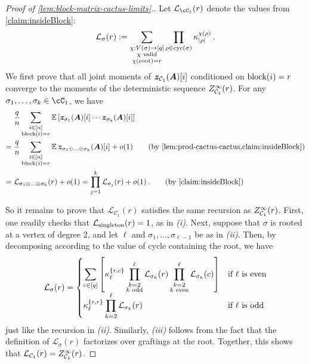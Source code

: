 \begin{proof}[Proof of \cref{lem:block-matrix-cactus-limits}.]    
    Let $\calL_{\cC_1}(r)$ denote the values from \cref{claim:insideBlock}:
    \[
        \mathcal L_{\sigma}(r) := \sum_{\substack{\chi:V(\sigma)\to [q]\\\chi \textnormal{ valid}\\\chi(\textnormal{root})=r}} \prod_{\rho \in \mathrm{cyc}(\sigma)} \kappa_{|\rho|}^{\chi(\rho)}\,.
    \]
    We first prove that all joint moments
    of
    $\bm z_{{\cal C}_1}(\bm A)[i]$ conditioned on $\operatorname{block}(i)=r$ converge to the moments
    of the deterministic sequence $Z^\infty_{{\cal C}_1}(r)$.
    For any $\sig_1, \ldots, \sig_k\in \cC_1$, we have
    \begin{align*}
        &\frac qn \sum_{\substack{i\in[n]\\\block(i) = r}} \E \left[\bm z_{\sigma_1}(\bA)[i]\cdots \bm z_{\sigma_k}(\bA)[i]\right]\\
        =\;&\frac qn \sum_{\substack{i\in [n]\\\block(i) = r}} \E \bm z_{\sigma_1\oplus \ldots \oplus\sigma_k}(\bm A)[i] + o(1)\tag*{\textnormal{(by~\Cref{lem:prod-cactus-cactus,claim:insideBlock})}}\\
        =\;& \mathcal L_{\sig_1 \oplus \ldots \oplus \sig_k}(r) + o(1) = \prod_{j = 1}^k \mathcal L_{\sigma_j}(r) + o(1)\,. \tag*{\textnormal{(by \cref{claim:insideBlock})}}
    \end{align*}

    So it remains to prove that $\mathcal L_{\mathcal C_1}(r)$ satisfies the same recursion as $Z^\infty_{{\cal C}_1}(r)$.
    First, one readily checks that $\mathcal L_{\textnormal{singleton}}(r) = 1$, as in {\em (i)}. Next, suppose that $\sigma$ is rooted at a vertex of degree 2, and let $\ell$ and $\sigma_1, \ldots, \sigma_{\ell-1}$ be as in {\em (ii)}. Then, by decomposing according to the value of cycle containing the root, we have
    \[
        \mathcal L_\sigma(r) =
        \begin{cases}
            \displaystyle
            \sum_{c\in [q]} \left[\kappa_\ell^{\{r,c\}}
            \prod_{\substack{k=2\\k\textnormal{ odd}}}^{\ell} \mathcal L_{\sigma_k}(r) \prod_{\substack{k=2\\k\textnormal{ even}}}^{\ell} \mathcal L_{\sigma_k}(c)\right]
            & \text{if $\ell$ is even} \\
            \displaystyle
            \kappa_\ell^{\{r,r\}}
            \prod_{k=2}^{\ell} \mathcal L_{\sigma_k}(r)
            & \text{if $\ell$ is odd}
        \end{cases}
    \]
    just like the recursion in {\em (ii)}. Similarly, {\em (iii)} follows from the
    fact that the definition of $\mathcal L_\sigma(r)$
    factorizes over graftings at the root.
    Together, this shows that $\mathcal L_{{\cal C}_1}(r) = Z^\infty_{{\cal C}_1}(r)$.


\end{proof}
